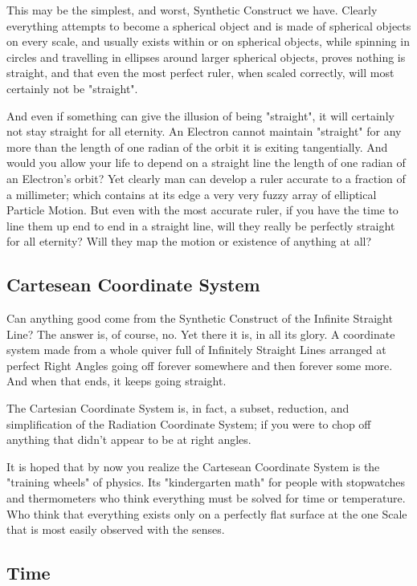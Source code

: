 \documentclass[12pt]{article}
\begin{document}
This may be the simplest, and worst, Synthetic Construct we have. Clearly everything attempts to become a spherical object and is made of spherical objects on every scale, and usually exists within or on spherical objects, while spinning in circles and travelling in ellipses around larger spherical objects, proves nothing is straight, and that even the most perfect ruler, when scaled correctly, will most certainly not be "straight". 

And even if something can give the illusion of being "straight", it will certainly not stay straight for all eternity. An Electron cannot maintain "straight" for any more than the length of one radian of the orbit it is exiting tangentially. And would you allow your life to depend on a straight line the length of one radian of an Electron's orbit? Yet clearly man can develop a ruler accurate to a fraction of a millimeter; which contains at its edge a very very fuzzy array of elliptical Particle Motion. But even with the most accurate ruler, if you have the time to line them up end to end in a straight line, will they really be perfectly straight for all eternity? Will they map the motion or existence of anything at all?



\subsection{Cartesean Coordinate System}

Can anything good come from the Synthetic Construct of the Infinite Straight Line? The answer is, of course, no. Yet there it is, in all its glory. A coordinate system made from a whole quiver full of Infinitely Straight Lines arranged at perfect Right Angles going off forever somewhere and then forever some more. And when that ends, it keeps going straight. 

The Cartesian Coordinate System is, in fact, a subset, reduction, and simplification of the Radiation Coordinate System; if you were to chop off anything that didn't appear to be at right angles.

It is hoped that by now you realize the Cartesean Coordinate System is the "training wheels" of physics. Its "kindergarten math" for people with stopwatches and thermometers who think everything must be solved for time or temperature. Who think that everything exists only on a perfectly flat surface at the one Scale that is most easily observed with the senses. 


\subsection{Time}
\end{document}
